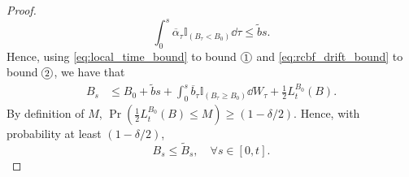 \documentclass[twocolumn,amsthm]{autart}
\newcommand*\circled[1]{\tikz[baseline=(char.base)]{
    \node[shape=circle,draw,inner sep=1pt] (char) {#1};}}
\begin{document}
\begin{proof}
\begin{equation} \label{eq:rcbf_drift_bound}
\int_0^s \overline{\alpha}_\tau \mathbb{I}_{(B_\tau < B_0)} \dd{\tau} \leq \tilde{b} s.
\end{equation}
Hence, using \eqref{eq:local_time_bound} to bound $\circled{\footnotesize 1}$ and \eqref{eq:rcbf_drift_bound} to bound $\circled{\footnotesize 2}$, we have that
\begin{align}
B_s &\leq B_0 + \tilde{b} s + \int_0^s \overline{b}_\tau \mathbb{I}_{(B_\tau \geq B_0)} \dd{W}_\tau + \frac{1}{2} L_t^{B_0}(B).
\end{align}
By definition of $M$, $\Pr(\frac{1}{2} L_t^{B_0}(B) \leq M) \geq (1 - \delta / 2)$.
Hence, with probability at least $(1 - \delta/2)$,
\begin{equation}
    B_s \leq \tilde{B}_s, \quad \forall s \in [0, t].
\end{equation}
\end{proof}
\end{document}

